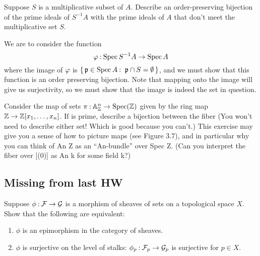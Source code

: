 \documentclass[12pt]{memoir}
\begin{document}
\begin{Ej}[3.2.K Vakil]
    Suppose $S$ is a multiplicative subset of $A$. Describe an order-preserving bijection of the prime ideals of $S^{-1}A$ with the prime ideals of $A$ that don't meet the multiplicative set $S$.
\end{Ej}

\begin{ptcbr}
    We are to consider the function 
    $$\varphi\mathbin{:}\operatorname{Spec} S^{-1}A\to\operatorname{Spec} A$$
    where the image of $\varphi$ is $\{\,\mathfrak{p}\in\operatorname{Spec} A\mathbin{:}\ \mathfrak{p}\cap S=\emptyset\,\}$, and we must show that this function is an order preserving bijection. Note that mapping onto the image will give us surjectivity, so we must show that the image is indeed the set in question. 
\end{ptcbr}

\begin{Ej}[3.2.Q Vakil]
    Consider the map of sets $\pi\mathbin{:}\mathbb{A}^n_{\mathbb{Z}}\to\operatorname{Spec}(\mathbb{Z})$
given by the ring map $\mathbb{Z}\to\mathbb{Z}[x_1,\dots,x_n]$. If  is prime, describe a bijection between the fiber  (You won’t need to describe either set! Which is good
because you can’t.) This exercise may give you a sense of how to picture maps (see Figure 3.7), and in particular why you can think of An Z as an “An-bundle” over Spec Z. (Can you interpret the fiber over [(0)] as An
k for some field k?)

\end{Ej}

\begin{ptcbr}
   
\end{ptcbr}
\subsection{Missing from last HW}

\begin{Ej}
    Suppose $\phi\mathbin{:}\mathcal{F}\to\mathcal{G}$ is a morphism of sheaves of sets on a topological space $X$. Show that the following are equivalent:
\begin{enumerate}
    \item $\phi$ is an epimorphism in the category of sheaves. 
    \item $\phi$ is surjective on the level of stalks: $\phi_p\mathbin{:}\mathcal{F}_p\to\mathcal{G}_p$ is surjective for $p\in X$.
\end{enumerate}
\end{Ej}
\end{document}

